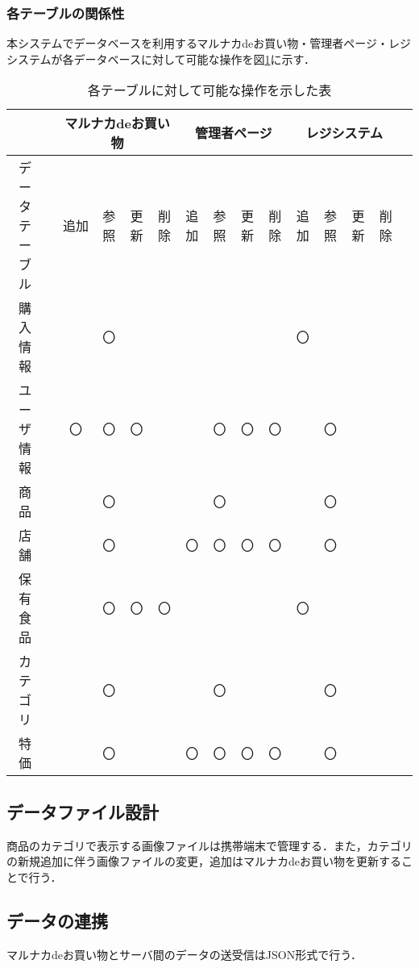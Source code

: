 \documentclass[a4j]{jarticle}
\begin{document}
\subsubsection{各テーブルの関係性}
本システムでデータベースを利用するマルナカdeお買い物・管理者ページ・レジシステムが各データベースに対して可能な操作を図\ref{tab:DB権限}に示す．
\begin{table}[H]
\caption{各テーブルに対して可能な操作を示した表}
\label{tab:DB権限}
\begin{center}
\begin{tabular}{|c|c|c|c|c|c|c|c|c|c|c|c|c|c|c|}%
\hline
&&\multicolumn{4}{|c|}{マルナカdeお買い物}&\multicolumn{4}{|c|}{管理者ページ}&\multicolumn{4}{|c|}{レジシステム}\\ \hline
データテーブル&&追加&参照&更新&削除&追加&参照&更新&削除&追加&参照&更新&削除\\ \hline\hline
購入情報	&&　&〇&	&	& 	&	&	&	&〇&&&\\ \hline
ユーザ情報	&&〇　&〇&〇	&	&	&〇&〇&〇& &〇&&\\ \hline
商品		&&　&〇&	&	& 	&〇&	&	& &〇&&\\ \hline
店舗		&&　&〇&	&	&〇&〇&〇&〇& &〇&&\\ \hline
保有食品	&&　&〇&〇&〇& 	&	&	&	& 〇&&&\\ \hline
カテゴリ		&&　&〇&	&	&	&〇&	&	& &〇&&\\ \hline
特価		&&　&〇&	&	&〇&〇&〇&〇& &〇&&\\ \hline

\end{tabular}
\end{center}
\end{table}

\subsection{データファイル設計}
商品のカテゴリで表示する画像ファイルは携帯端末で管理する．また，カテゴリの新規追加に伴う画像ファイルの変更，追加はマルナカdeお買い物を更新することで行う．\\
\subsection{データの連携}
マルナカdeお買い物とサーバ間のデータの送受信はJSON形式で行う．
\end{document}
